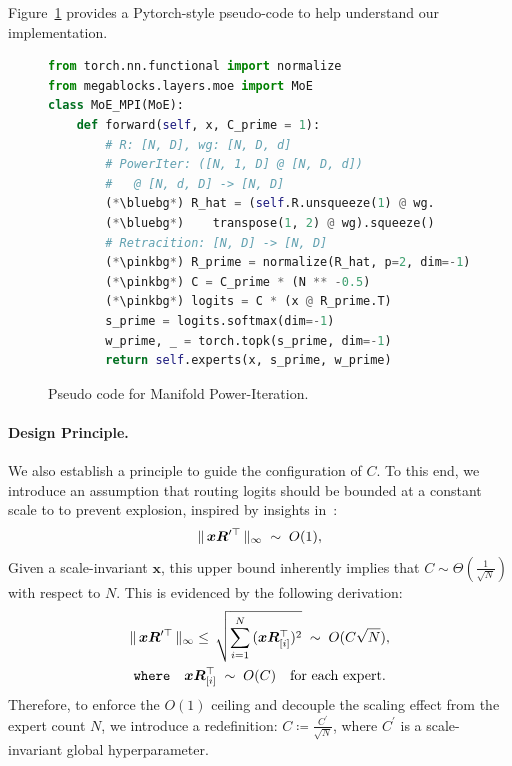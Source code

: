 \documentclass[11pt]{article}
\newcommand{\bluebg}{%
  \rlap{%
    \color{codeblue}%
    \hspace{-3.2em}%
    \rule[-0.35em]{\dimexpr\linewidth}{1.2em}%
  }%
}
\newcommand{\pinkbg}{%
  \rlap{%
    \color{codepink}%
    \hspace{-3.2em}%
    \rule[-0.35em]{\dimexpr\linewidth}{1.2em}%
  }%
}
\begin{document}
Figure~\ref{fig:code} provides a Pytorch-style pseudo-code to help understand our implementation.
\begin{figure}[h]
\begin{lstlisting}[language={Python}]
from torch.nn.functional import normalize
from megablocks.layers.moe import MoE
class MoE_MPI(MoE):
    def forward(self, x, C_prime = 1):
        # R: [N, D], wg: [N, D, d]
        # PowerIter: ([N, 1, D] @ [N, D, d]) 
        #   @ [N, d, D] -> [N, D]
        (*\bluebg*) R_hat = (self.R.unsqueeze(1) @ wg.
        (*\bluebg*)    transpose(1, 2) @ wg).squeeze()
        # Retracition: [N, D] -> [N, D] 
        (*\pinkbg*) R_prime = normalize(R_hat, p=2, dim=-1)
        (*\pinkbg*) C = C_prime * (N ** -0.5)
        (*\pinkbg*) logits = C * (x @ R_prime.T)
        s_prime = logits.softmax(dim=-1)
        w_prime, _ = torch.topk(s_prime, dim=-1)
        return self.experts(x, s_prime, w_prime)        
\end{lstlisting}
\caption{Pseudo code for Manifold Power-Iteration.}
\label{fig:code}
\end{figure}

\paragraph{Design Principle.} We also establish a principle to guide the configuration of $C$.
To this end, we introduce an assumption that routing logits should be bounded at a constant scale to to prevent explosion, inspired by insights in~\citep{scion}:
\[
    {\| \, {\bm{x}}{\bm{R}}^{\prime\top} \, \|_{\infty}} \; \sim \; O(1),
\]
Given a scale-invariant $\mathbf{x}$, this upper bound inherently implies that $C \sim \Theta(\frac{1}{\sqrt{N}})$ with respect to $N$.
This is evidenced by the following derivation:
\begin{gather}
    \| \, {\bm{x}}{\bm{R}}^{\prime\top} \, \|_{\infty} \le \, \sqrt{\sum_{i=1}^N{({\bm{x}}{\bm{R}}_{[i]}^\top)^2}} \; \sim \; O(C\sqrt{N}), \nonumber \\
    \texttt{where} \quad {\bm{x}}{\bm{R}}_{[i]}^\top \; \sim \; O(C) \quad \text{for each expert}.
\end{gather}
Therefore, to enforce the $O(1)$ ceiling and decouple the scaling effect from the expert count $N$, we introduce a redefinition: $C \coloneqq \frac{C^\prime}{\sqrt{N}}$, where $C^\prime$ is a scale-invariant global hyperparameter.
\end{document}
